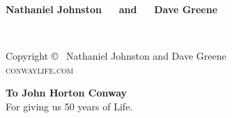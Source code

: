 \documentclass[11pt]{book}
\begin{document}
\vspace*{5.55in}\textbf{\textsf{{\fontsize{16}{40}\selectfont Nathaniel Johnston} $\quad$ and $\quad$ {\fontsize{16}{40}\selectfont Dave Greene}}}
\vfill
\endgroup


\newpage
~\vfill
\thispagestyle{empty}

\noindent Copyright \copyright\ {\the\year} Nathaniel Johnston and Dave Greene\\ %


\noindent \textsc{conwaylife.com}\\ %



\clearpage

\vspace*{1.5in}
\begin{center}
	\textbf{\large To John Horton Conway}\\For giving us 50 years of Life.
\end{center}






\setcounter{tocdepth}{1}
\pagestyle{empty} %

\tableofcontents %

\cleardoublepage %

\pagestyle{fancy} %


\renewcommand{\chaptermark}[1]{\markboth{\sffamily\normalsize\bfseries Preface}{}} %
\end{document}
